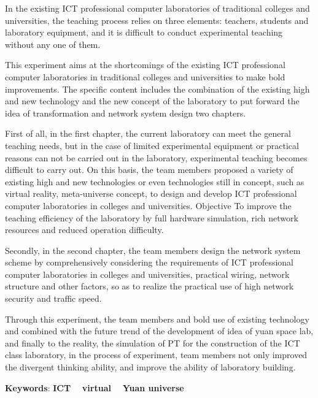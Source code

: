 \documentclass{imutthesis}
\begin{document}
\begin{enabstract}
    In the existing ICT professional computer laboratories of traditional colleges and universities, the teaching process relies on three elements: teachers, students and laboratory equipment, and it is difficult to conduct experimental teaching without any one of them.

This experiment aims at the shortcomings of the existing ICT professional computer laboratories in traditional colleges and universities to make bold improvements. The specific content includes the combination of the existing high and new technology and the new concept of the laboratory to put forward the idea of transformation and network system design two chapters.

First of all, in the first chapter, the current laboratory can meet the general teaching needs, but in the case of limited experimental equipment or practical reasons can not be carried out in the laboratory, experimental teaching becomes difficult to carry out. On this basis, the team members proposed a variety of existing high and new technologies or even technologies still in concept, such as virtual reality, meta-universe concept, to design and develop ICT professional computer laboratories in colleges and universities. Objective To improve the teaching efficiency of the laboratory by full hardware simulation, rich network resources and reduced operation difficulty.

Secondly, in the second chapter, the team members design the network system scheme by comprehensively considering the requirements of ICT professional computer laboratories in colleges and universities, practical wiring, network structure and other factors, so as to realize the practical use of high network security and traffic speed.

Through this experiment, the team members and bold use of existing technology and combined with the future trend of the development of idea of yuan space lab, and finally to the reality, the simulation of PT for the construction of the ICT class laboratory, in the process of experiment, team members not only improved the divergent thinking ability, and improve the ability of laboratory building.

	\par \textbf{Keywords}:  \textbf{ICT}$\quad$ \textbf{virtual}$\quad$ \textbf{Yuan universe}  %

\end{enabstract}
\end{document}
